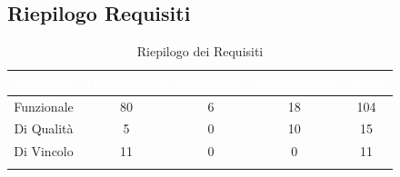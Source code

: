 \subsection{Riepilogo Requisiti}\label{Riepilogo}
\begin{center}
\begin{longtable}[c]{|c|c|c|c|c|}
\hline
\rowcolor{bluelogo}\textbf{\textcolor{white}{Tipologia}} & \textbf{\textcolor{white}{Obbligatorio}} & \textbf{\textcolor{white}{Opzionale}} & \textbf{\textcolor{white}{Desiderabile}} & \textbf{\textcolor{white}{Totale}}\\
\hline \hline
\endhead
Funzionale & 80 & 6 & 18 & 104\\
\hline
\rowcolor{grigio}Di Qualità & 5 & 0 & 10 & 15\\
\hline
Di Vincolo & 11 & 0 & 0 & 11\\
\hline
\caption{Riepilogo dei Requisiti}
\end{longtable}
\end{center}
